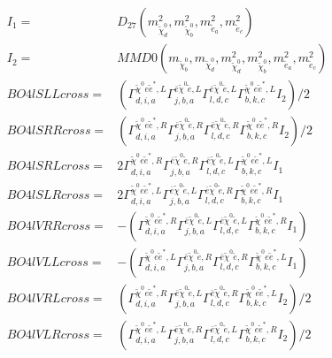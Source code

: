 \documentclass[A4,landscape]{article}
\begin{document}
\begin{align} 
I_1 = & D_{27}(m^2_{\tilde{\chi}^0_{{d}}}, m^2_{\tilde{\chi}^0_{{b}}}, m^2_{\tilde{e}_{{a}}}, m^2_{\tilde{e}_{{c}}}) \\ 
I_2 = & MMD0(m_{\tilde{\chi}^0_{{b}}}, m_{\tilde{\chi}^0_{{d}}}, m^2_{\tilde{\chi}^0_{{d}}}, m^2_{\tilde{\chi}^0_{{b}}}, m^2_{\tilde{e}_{{a}}}, m^2_{\tilde{e}_{{c}}}) \\ 
  BO4lSLLcross= & ( \Gamma^{\tilde{\chi}^0 e \tilde{e}^*,L}_{d, i, a} \Gamma^{\bar{e}\tilde{\chi}^0 \tilde{e} ,L}_{j, b, a} \Gamma^{\bar{e}\tilde{\chi}^0 \tilde{e} ,L}_{l, d, c} \Gamma^{\tilde{\chi}^0 e \tilde{e}^*,L}_{b, k, c} I_2)/2 \\ 
  BO4lSRRcross= & ( \Gamma^{\tilde{\chi}^0 e \tilde{e}^*,R}_{d, i, a} \Gamma^{\bar{e}\tilde{\chi}^0 \tilde{e} ,R}_{j, b, a} \Gamma^{\bar{e}\tilde{\chi}^0 \tilde{e} ,R}_{l, d, c} \Gamma^{\tilde{\chi}^0 e \tilde{e}^*,R}_{b, k, c} I_2)/2 \\ 
  BO4lSRLcross= & 2  \Gamma^{\tilde{\chi}^0 e \tilde{e}^*,R}_{d, i, a} \Gamma^{\bar{e}\tilde{\chi}^0 \tilde{e} ,R}_{j, b, a} \Gamma^{\bar{e}\tilde{\chi}^0 \tilde{e} ,L}_{l, d, c} \Gamma^{\tilde{\chi}^0 e \tilde{e}^*,L}_{b, k, c} I_1 \\ 
  BO4lSLRcross= & 2  \Gamma^{\tilde{\chi}^0 e \tilde{e}^*,L}_{d, i, a} \Gamma^{\bar{e}\tilde{\chi}^0 \tilde{e} ,L}_{j, b, a} \Gamma^{\bar{e}\tilde{\chi}^0 \tilde{e} ,R}_{l, d, c} \Gamma^{\tilde{\chi}^0 e \tilde{e}^*,R}_{b, k, c} I_1 \\ 
  BO4lVRRcross= & -( \Gamma^{\tilde{\chi}^0 e \tilde{e}^*,R}_{d, i, a} \Gamma^{\bar{e}\tilde{\chi}^0 \tilde{e} ,L}_{j, b, a} \Gamma^{\bar{e}\tilde{\chi}^0 \tilde{e} ,L}_{l, d, c} \Gamma^{\tilde{\chi}^0 e \tilde{e}^*,R}_{b, k, c} I_1) \\ 
  BO4lVLLcross= & -( \Gamma^{\tilde{\chi}^0 e \tilde{e}^*,L}_{d, i, a} \Gamma^{\bar{e}\tilde{\chi}^0 \tilde{e} ,R}_{j, b, a} \Gamma^{\bar{e}\tilde{\chi}^0 \tilde{e} ,R}_{l, d, c} \Gamma^{\tilde{\chi}^0 e \tilde{e}^*,L}_{b, k, c} I_1) \\ 
  BO4lVRLcross= & ( \Gamma^{\tilde{\chi}^0 e \tilde{e}^*,R}_{d, i, a} \Gamma^{\bar{e}\tilde{\chi}^0 \tilde{e} ,L}_{j, b, a} \Gamma^{\bar{e}\tilde{\chi}^0 \tilde{e} ,R}_{l, d, c} \Gamma^{\tilde{\chi}^0 e \tilde{e}^*,L}_{b, k, c} I_2)/2 \\ 
  BO4lVLRcross= & ( \Gamma^{\tilde{\chi}^0 e \tilde{e}^*,L}_{d, i, a} \Gamma^{\bar{e}\tilde{\chi}^0 \tilde{e} ,R}_{j, b, a} \Gamma^{\bar{e}\tilde{\chi}^0 \tilde{e} ,L}_{l, d, c} \Gamma^{\tilde{\chi}^0 e \tilde{e}^*,R}_{b, k, c} I_2)/2 \\ 

\end{align}
\end{document}
